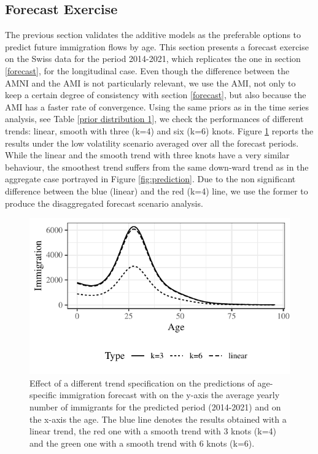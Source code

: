 \documentclass{article}\usepackage[]{graphicx}\usepackage[]{color}
\begin{document}
\subsection{Forecast Exercise}\label{disaggregated forecast}

The previous section validates the additive models as the preferable options to predict future immigration flows by age. This section presents a forecast exercise on the Swiss data for the period 2014-2021, which replicates the one in section \ref{forecast}, for the longitudinal case. Even though the difference between the AMNI and the AMI is not particularly relevant, we use the AMI, not only to keep a certain degree of consistency with section \ref{forecast}, but also because the AMI has a faster rate of convergence. Using the same priors as in the time series analysis, see Table \ref{prior distribution 1}, we check the performances of different trends: linear, smooth with three (k=4) and six (k=6) knots. Figure \ref{fig:trend comparison} reports the results under the low volatility scenario averaged over all the forecast periods. While the linear and the smooth trend with three knots have a very similar behaviour, the smoothest trend suffers from the same down-ward trend as in the aggregate case portrayed in Figure \ref{fig:prediction}. Due to the non significant difference between the blue (linear) and the red (k=4) line, we use the former to produce the disaggregated forecast scenario analysis. 

\begin{figure}
\centering
\includegraphics[scale=1]{Plot_trend_dis.pdf}
\caption{Effect of a different trend specification on the predictions of age-specific immigration forecast with on the y-axis the average yearly number of immigrants for the predicted period (2014-2021) and on the x-axis the age. The blue line denotes the results obtained with a linear trend, the red one with a smooth trend with 3 knots (k=4) and the green one with a smooth trend with 6 knots (k=6).}
\label{fig:trend comparison}
\end{figure}
\end{document}
